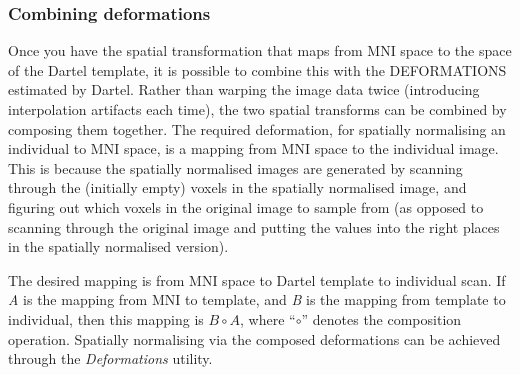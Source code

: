 \subsubsection{Combining deformations}
Once you have the spatial transformation that maps from MNI space to the space of the Dartel template, it is possible to combine this with the DEFORMATIONS estimated by Dartel.
Rather than warping the image data twice (introducing interpolation artifacts each time), the two spatial transforms can be combined by composing them together.
The required deformation, for spatially normalising an individual to MNI space, is a mapping from MNI space to the individual image.
This is because the spatially normalised images are generated by scanning through the (initially empty) voxels in the spatially normalised image, and figuring out which voxels in the original image to sample from (as opposed to scanning through the original image and putting the values into the right places in the spatially normalised version).

The desired mapping is from MNI space to Dartel template to individual scan.
If \emph{A} is the mapping from MNI to template, and \emph{B} is the mapping from template to individual, then this mapping is $B \circ A$, where ``$\circ$'' denotes the composition operation.
Spatially normalising via the composed deformations can be achieved through the \emph{Deformations} utility. 

